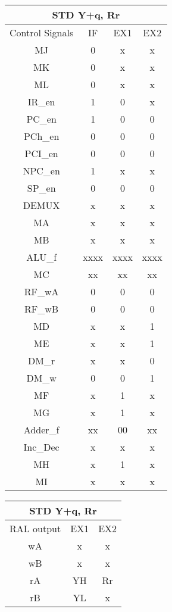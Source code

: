 \documentclass[12pt,letterpaper]{article}
\begin{document}
\begin{enumerate}
		\begin{tabular}{ |c|c|c|c| } 
			\hline
			\multicolumn{4}{|c|}{STD Y+q, Rr}\\ \hline
			Control Signals & IF & EX1 & EX2 \\ \hline
			MJ & 0  &  x & x \\ \hline
			MK & 0 &  x & x \\ \hline
			ML & 0 &  x & x \\ \hline
			IR\_en& 1 & 0 & x \\ \hline
			PC\_en & 1 & 0 & 0\\ \hline
			PCh\_en & 0 & 0 & 0 \\ \hline
			PCI\_en  & 0 & 0 & 0 \\ \hline
			NPC\_en  & 1 & x & x \\ \hline
			SP\_en  & 0 & 0 & 0 \\ \hline
			DEMUX  & x & x & x \\ \hline
			MA  & x & x &  x \\ \hline
			MB  & x & x & x \\ \hline
			ALU\_f  & xxxx & xxxx &  xxxx\\ \hline
			MC  & xx & xx & xx \\ \hline
			RF\_wA  & 0 & 0 & 0 \\ \hline
			RF\_wB  & 0 & 0 & 0 \\ \hline
			MD  & x & x & 1 \\ \hline
			ME  & x & x & 1 \\ \hline
			DM\_r  & x & x & 0 \\ \hline
			DM\_w  & 0 & 0 & 1 \\ \hline
			MF  & x & 1 &  x \\ \hline
			MG  & x & 1 & x \\ \hline
			Adder\_f  & xx & 00 & xx \\ \hline
			Inc\_Dec  & x & x &  x \\ \hline
			MH  & x & 1 &  x \\ \hline
			MI  & x & x & x\\ \hline
		\end{tabular}
		\quad
		\quad
		\begin{tabular}{ |c|c|c|} 
			\hline
			\multicolumn{3}{|c|}{STD Y+q, Rr}\\ \hline
			RAL output & EX1 & EX2 \\ \hline
			wA & x &  x \\ \hline
			wB & x &  x \\ \hline
			rA &  YH & Rr \\ \hline
			rB &  YL & x \\ \hline
		\end{tabular}
		

\end{enumerate}
\end{document}
